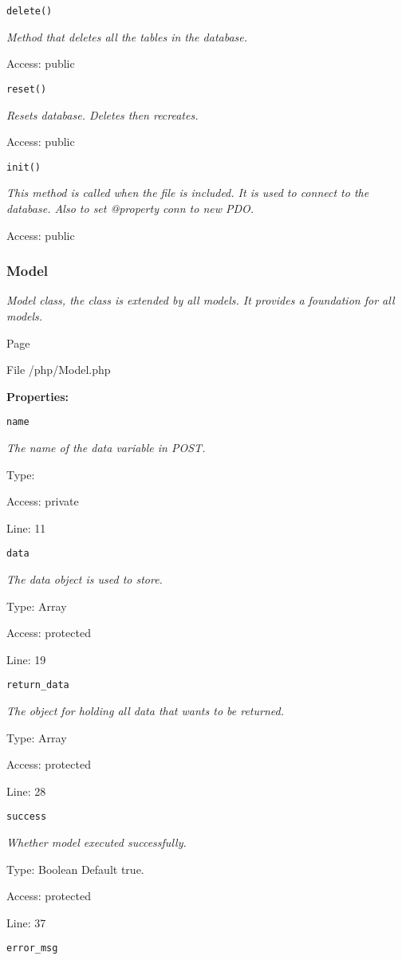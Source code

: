 \texttt{delete()}

{\scriptsize
\textit{Method that deletes all the tables in the database.}

Access: public

}

\texttt{reset()}

{\scriptsize
\textit{Resets database.
Deletes then recreates.}

Access: public

}

\texttt{init()}

{\scriptsize
\textit{This method is called when the file is included.
It is used to connect to the database.
Also to set @property conn to new PDO.}

Access: public

}

\subsubsection{Model}
\textit{Model class, the class is extended by all models.
It provides a foundation for all models.}

Page \pageref{Model.php}

File /php/Model.php

\textbf{Properties:}

\texttt{name}

{\scriptsize
\textit{The name of the data variable in POST.}

Type: 

Access: private

Line: 11

}
\texttt{data}

{\scriptsize
\textit{The data object is used to store.}

Type: Array

Access: protected

Line: 19

}
\texttt{return\_data}

{\scriptsize
\textit{The object for holding all data that wants to be returned.}

Type: Array

Access: protected

Line: 28

}
\texttt{success}

{\scriptsize
\textit{Whether model executed successfully.}

Type: {Boolean} Default true.

Access: protected

Line: 37

}
\texttt{error\_msg}

